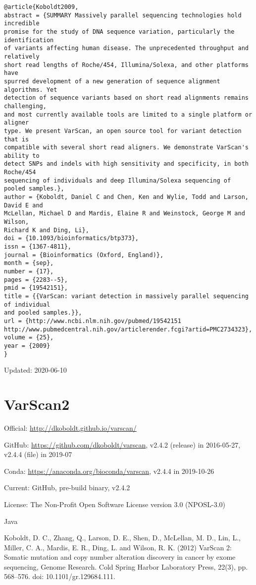 \documentclass[]{article}
\begin{document}
\begin{verbatim}
@article{Koboldt2009,
abstract = {SUMMARY Massively parallel sequencing technologies hold incredible
promise for the study of DNA sequence variation, particularly the identification
of variants affecting human disease. The unprecedented throughput and relatively
short read lengths of Roche/454, Illumina/Solexa, and other platforms have
spurred development of a new generation of sequence alignment algorithms. Yet
detection of sequence variants based on short read alignments remains challenging,
and most currently available tools are limited to a single platform or aligner
type. We present VarScan, an open source tool for variant detection that is
compatible with several short read aligners. We demonstrate VarScan's ability to
detect SNPs and indels with high sensitivity and specificity, in both Roche/454
sequencing of individuals and deep Illumina/Solexa sequencing of pooled samples.},
author = {Koboldt, Daniel C and Chen, Ken and Wylie, Todd and Larson, David E and
McLellan, Michael D and Mardis, Elaine R and Weinstock, George M and Wilson,
Richard K and Ding, Li},
doi = {10.1093/bioinformatics/btp373},
issn = {1367-4811},
journal = {Bioinformatics (Oxford, England)},
month = {sep},
number = {17},
pages = {2283--5},
pmid = {19542151},
title = {{VarScan: variant detection in massively parallel sequencing of individual
and pooled samples.}},
url = {http://www.ncbi.nlm.nih.gov/pubmed/19542151
http://www.pubmedcentral.nih.gov/articlerender.fcgi?artid=PMC2734323},
volume = {25},
year = {2009}
}

\end{verbatim}

Updated: 2020-06-10

\section{VarScan2}

Official: \url{http://dkoboldt.github.io/varscan/}

GitHub: \url{https://github.com/dkoboldt/varscan}, v2.4.2 (release) in 2016-05-27, v2.4.4 (file) in 2019-07

Conda: \url{https://anaconda.org/bioconda/varscan}, v2.4.4 in 2019-10-26

Current: GitHub, pre-build binary, v2.4.2

License: The Non-Profit Open Software License version 3.0 (NPOSL-3.0)

Java

Koboldt, D. C., Zhang, Q., Larson, D. E., Shen, D., McLellan, M. D., Lin, L., Miller, C. A., Mardis, E. R., Ding, L. and Wilson, R. K. (2012) VarScan 2: Somatic mutation and copy number alteration discovery in cancer by exome sequencing, Genome Research. Cold Spring Harbor Laboratory Press, 22(3), pp. 568–576. doi: 10.1101/gr.129684.111.
\end{document}
